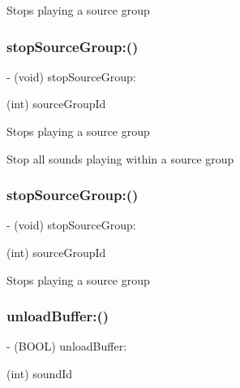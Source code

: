 Stops playing a source group \mbox{\label{interfaceCDSoundEngine_a5d6fbd530895fac2ce486a478e46fb23}} 
\subsubsection{\texorpdfstring{stop\+Source\+Group\+:()}{stopSourceGroup:()}\hspace{0.1cm}{\footnotesize\ttfamily [3/4]}}
{\footnotesize\ttfamily -\/ (void) stop\+Source\+Group\+: \begin{DoxyParamCaption}\item[{(int)}]{source\+Group\+Id }\end{DoxyParamCaption}}

Stops playing a source group

Stop all sounds playing within a source group \mbox{\label{interfaceCDSoundEngine_a5d6fbd530895fac2ce486a478e46fb23}} 
\subsubsection{\texorpdfstring{stop\+Source\+Group\+:()}{stopSourceGroup:()}\hspace{0.1cm}{\footnotesize\ttfamily [4/4]}}
{\footnotesize\ttfamily -\/ (void) stop\+Source\+Group\+: \begin{DoxyParamCaption}\item[{(int)}]{source\+Group\+Id }\end{DoxyParamCaption}}

Stops playing a source group \mbox{\label{interfaceCDSoundEngine_a2a245d09bd9aa88de752c97dd889662e}} 
\subsubsection{\texorpdfstring{unload\+Buffer\+:()}{unloadBuffer:()}}
{\footnotesize\ttfamily -\/ (B\+O\+OL) unload\+Buffer\+: \begin{DoxyParamCaption}\item[{(int)}]{sound\+Id }\end{DoxyParamCaption}}

